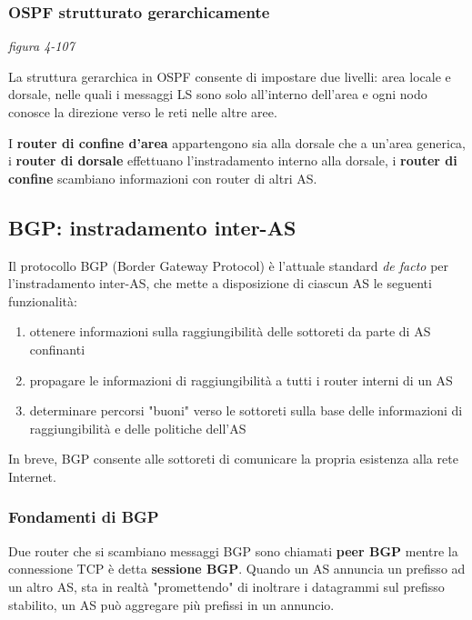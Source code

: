 \documentclass[
]{article}
\begin{document}
\hypertarget{header-n263}{%
\subsubsection{OSPF strutturato gerarchicamente}\label{header-n263}}

\emph{figura 4-107}

La struttura gerarchica in OSPF consente di impostare due livelli: area
locale e dorsale, nelle quali i messaggi LS sono solo all'interno
dell'area e ogni nodo conosce la direzione verso le reti nelle altre
aree.

I \textbf{router di confine d'area} appartengono sia alla dorsale che a
un'area generica, i \textbf{router di dorsale} effettuano
l'instradamento interno alla dorsale, i \textbf{router di confine}
scambiano informazioni con router di altri AS.

\hypertarget{header-n267}{%
\subsection{BGP: instradamento inter-AS}\label{header-n267}}

Il protocollo BGP (Border Gateway Protocol) è l'attuale standard
\emph{de facto} per l'instradamento inter-AS, che mette a disposizione
di ciascun AS le seguenti funzionalità:

\begin{enumerate}
\def\labelenumi{\arabic{enumi}.}
\item
  ottenere informazioni sulla raggiungibilità delle sottoreti da parte
  di AS confinanti
\item
  propagare le informazioni di raggiungibilità a tutti i router interni
  di un AS
\item
  determinare percorsi "buoni" verso le sottoreti sulla base delle
  informazioni di raggiungibilità e delle politiche dell'AS
\end{enumerate}

In breve, BGP consente alle sottoreti di comunicare la propria esistenza
alla rete Internet.

\hypertarget{header-n280}{%
\subsubsection{Fondamenti di BGP}\label{header-n280}}

Due router che si scambiano messaggi BGP sono chiamati \textbf{peer BGP}
mentre la connessione TCP è detta \textbf{sessione BGP}. Quando un AS
annuncia un prefisso ad un altro AS, sta in realtà "promettendo" di
inoltrare i datagrammi sul prefisso stabilito, un AS può aggregare più
prefissi in un annuncio.
\end{document}
